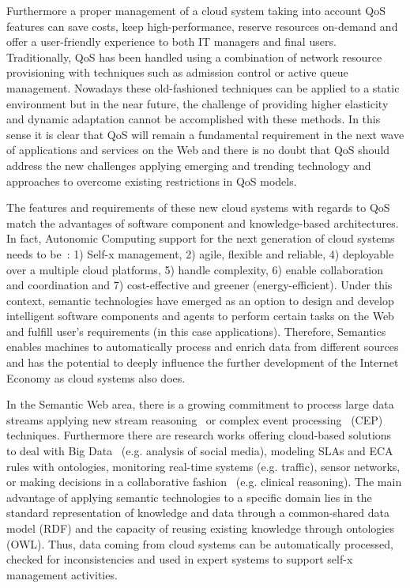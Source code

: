 Furthermore a proper management of a cloud system taking into account QoS 
features can save costs, keep high-performance, reserve resources on-demand and 
offer a user-friendly experience to both IT managers and final users. 
Traditionally, QoS has been handled using a combination of network resource 
provisioning with techniques such as admission control or active queue 
management. Nowadays these old-fashioned techniques can be applied to a static 
environment but in the near future, the challenge of providing higher elasticity and 
dynamic adaptation cannot be accomplished with these methods. In this sense it 
is clear that QoS will remain a fundamental requirement in the next wave of 
applications and services on the Web and there is no doubt that QoS should 
address the new challenges applying emerging and trending technology and 
approaches to overcome existing restrictions in QoS models.

The features and requirements of these new cloud systems with regards 
to QoS~\cite{Pedersen:2011:AMQ:2114495.2115542} match the advantages of software component and 
knowledge-based architectures. In fact, Autonomic Computing support for the next generation of cloud systems 
needs to be~\cite{Conejero:2012:MSQ:2357487.2357591,Pedersen:2011:AMQ:2114495.2115542}: 
1) Self-x management, 2) agile, flexible and reliable, 4) deployable over a multiple cloud platforms, 5) handle complexity, 6) enable 
collaboration and coordination and 7) cost-effective and greener 
(energy-efficient). Under this context, semantic technologies have emerged as an 
option to design and develop intelligent software components and agents to 
perform certain tasks on the Web and fulfill user's requirements (in this case 
applications). Therefore, Semantics enables machines to automatically process 
and enrich data from different sources and has the potential to deeply influence 
the further development of the Internet Economy as cloud systems also does.

In the Semantic Web area, there is a growing commitment to process large data streams applying 
new stream reasoning~\cite{Bolles:2008:SSE:1789394.1789438,Barbieri:2010:EEC:1739041.1739095} 
or complex event processing~\cite{Anicic:2011:EUL:1963405.1963495} (CEP) techniques. Furthermore there are research works offering cloud-based 
solutions to deal with Big Data~\cite{Fan:2013:MBD:2481244.2481246} (e.g. analysis of social media), modeling SLAs and ECA rules with ontologies, 
monitoring real-time systems (e.g. traffic), sensor networks, or making decisions in a collaborative fashion~\cite{RodriGuez-GonzaLez:2012:UAP:2350799.2350907} (e.g. clinical reasoning). 
The main advantage of applying semantic technologies to a specific domain lies in the standard representation of knowledge and data through a common-shared data model (RDF) and the 
capacity of reusing existing knowledge through ontologies (OWL). Thus, data coming from cloud systems can be automatically processed, checked for inconsistencies and 
used in expert systems to support self-x management activities.


